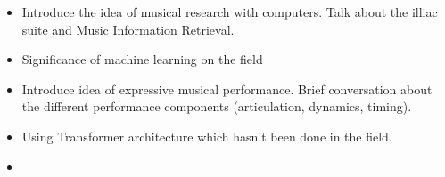 


\begin{itemize}
    \item Introduce the idea of musical research with computers. Talk about the illiac suite \cite{sandred2009revisiting} and Music Information Retrieval.
    \item Significance of machine learning on the field 
    \item Introduce idea of expressive musical performance. Brief conversation about the different performance components (articulation, dynamics, timing). 
    \item Using Transformer architecture which hasn't been done in the field. 
    \item {}
\end{itemize}